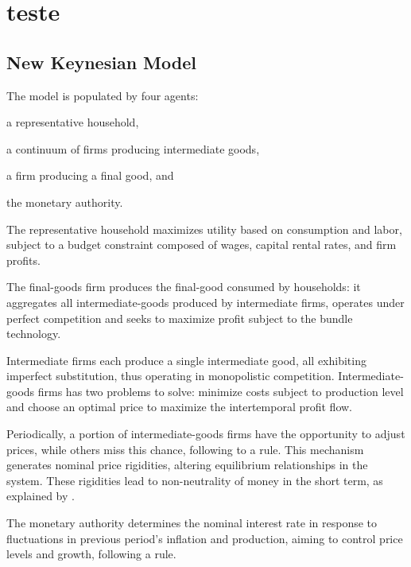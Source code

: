 \documentclass[
	thesis.tex
	]{subfiles}
\begin{document}
\section{teste}

\localtableofcontents

\subsection{New Keynesian Model}\label{sec:nk-model}

The model is populated by four agents: 
\begin{enumerate*}[label=(\arabic*)]
	\item a representative household,
	\item a continuum of firms producing intermediate goods,
	\item a firm producing a final good, and
	\item the monetary authority.
\end{enumerate*}

	The representative household maximizes utility based on consumption and labor, subject to a budget constraint composed of wages, capital rental rates, and firm profits.
	
	The final-goods firm produces the final-good consumed by households: it aggregates all intermediate-goods produced by intermediate firms, operates under perfect competition and seeks to maximize profit subject to the bundle technology.
	
	Intermediate firms each produce a single intermediate good, all exhibiting imperfect substitution, thus operating in monopolistic competition. Intermediate-goods firms has two problems to solve: minimize costs subject to production level and choose an optimal price to maximize the intertemporal profit flow.
	
	Periodically, a portion of intermediate-goods firms have the opportunity to adjust prices, while others miss this chance, following to a \textcite{calvo_staggered_1983} rule. This mechanism generates nominal price rigidities, altering equilibrium relationships in the system. These rigidities lead to non-neutrality of money in the short term, as explained by \textcite[p.191]{costa_junior_understanding_2016}.
	
	The monetary authority determines the nominal interest rate in response to fluctuations in previous period's inflation and production, aiming to control price levels and growth, following a \textcite{taylor_discretion_1993} rule.
	
\end{document}
